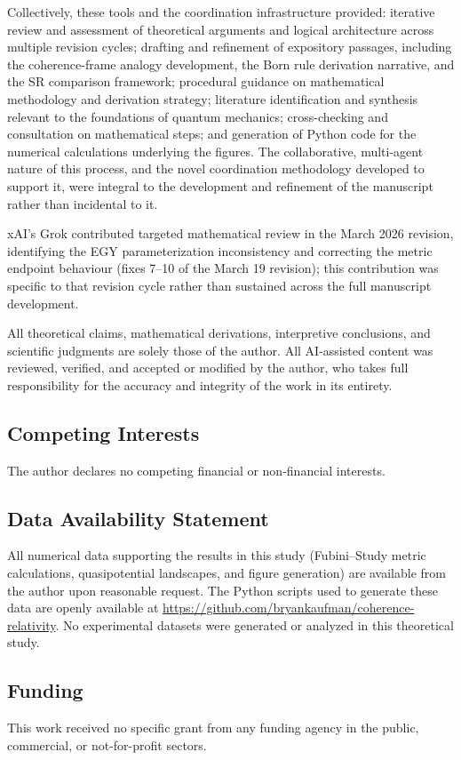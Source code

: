 \documentclass[aps,prd,twocolumn,superscriptaddress,nofootinbib,floatfix]{revtex4-2}
\begin{document}
Collectively, these tools and the coordination infrastructure provided: iterative review
and assessment of theoretical arguments and logical architecture across multiple revision
cycles; drafting and refinement of expository passages, including the coherence-frame
analogy development, the Born rule derivation narrative, and the SR comparison framework;
procedural guidance on mathematical methodology and derivation strategy; literature
identification and synthesis relevant to the foundations of quantum mechanics; cross-checking
and consultation on mathematical steps; and generation of Python code for the numerical
calculations underlying the figures. The collaborative, multi-agent nature of this process,
and the novel coordination methodology developed to support it, were integral to the
development and refinement of the manuscript rather than incidental to it.

xAI's Grok contributed targeted mathematical review in the March 2026 revision, identifying the EGY parameterization inconsistency and correcting the metric endpoint behaviour (fixes 7--10 of the March 19 revision); this contribution was specific to that revision cycle rather than sustained across the full manuscript development.

All theoretical
claims, mathematical derivations, interpretive conclusions, and scientific judgments are
solely those of the author. All AI-assisted content was reviewed, verified, and accepted or
modified by the author, who takes full responsibility for the accuracy and integrity of the
work in its entirety.

\subsection*{Competing Interests}
The author declares no competing financial or non-financial interests.

\subsection*{Data Availability Statement}
All numerical data supporting the results in this study (Fubini--Study metric calculations, quasipotential landscapes, and figure generation) are available from the author upon reasonable request. The Python scripts used to generate these data are openly available at \url{https://github.com/bryankaufman/coherence-relativity}. No experimental datasets were generated or analyzed in this theoretical study.

\subsection*{Funding}
This work received no specific grant from any funding agency in the public, commercial, or not-for-profit sectors.
\end{document}
